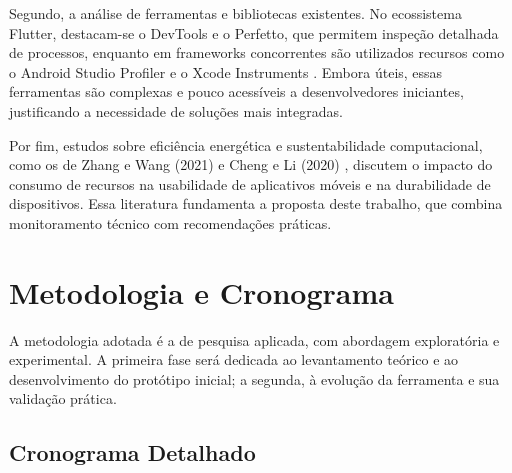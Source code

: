 \documentclass[12pt,a4paper]{article}
\begin{document}
Segundo, a análise de ferramentas e bibliotecas existentes. No ecossistema Flutter, destacam-se o DevTools e o Perfetto, que permitem inspeção detalhada de processos, enquanto em frameworks concorrentes são utilizados recursos como o Android Studio Profiler e o Xcode Instruments \cite{flutter, dart}. Embora úteis, essas ferramentas são complexas e pouco acessíveis a desenvolvedores iniciantes, justificando a necessidade de soluções mais integradas.  

Por fim, estudos sobre eficiência energética e sustentabilidade computacional, como os de Zhang e Wang (2021) \cite{energy} e Cheng e Li (2020) \cite{mobile_energy}, discutem o impacto do consumo de recursos na usabilidade de aplicativos móveis e na durabilidade de dispositivos. Essa literatura fundamenta a proposta deste trabalho, que combina monitoramento técnico com recomendações práticas.

\section{Metodologia e Cronograma}

A metodologia adotada é a de pesquisa aplicada, com abordagem exploratória e experimental. A primeira fase será dedicada ao levantamento teórico e ao desenvolvimento do protótipo inicial; a segunda, à evolução da ferramenta e sua validação prática.  

\subsection*{Cronograma Detalhado}
\end{document}
